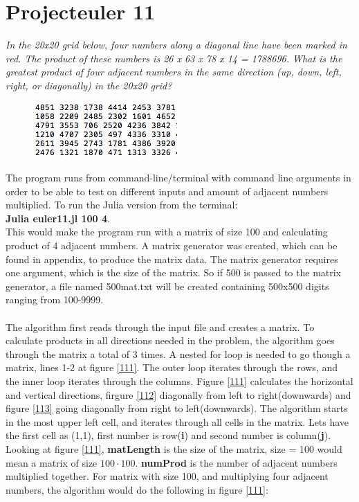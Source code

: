 \documentclass[a4paper,11pt]{article}
\begin{document}
\section{Projecteuler 11}

\textit{In the 20x20 grid below, four numbers along a diagonal line have been marked in red. The product of these numbers is 26 x 63 x 78 x 14 = 1788696. What is the greatest product of four adjacent numbers in the same direction (up, down, left, right, or diagonally) in the 20x20 grid?}
\begin{figure}[H]
	\begin{center}
	\includegraphics[scale=0.80]{11.jpg}
	\label{11}
	\end{center}
\end{figure}
The program runs from command-line/terminal with command line arguments in order to be able to test on different inputs and amount of adjacent numbers multiplied. To run the Julia version from the terminal: \\
\textbf{Julia euler11.jl 100 4}. \\
This would make the program run with a matrix of size 100 and calculating product of 4 adjacent numbers. A matrix generator was created, which can be found in appendix, to produce the matrix data. The matrix generator requires one argument, which is the size of the matrix. So if 500 is passed to the matrix generator, a file named 500mat.txt will be created containing 500x500 digits ranging from 100-9999.\\
\\
The algorithm first reads through the input file and creates a matrix. To calculate products in all directions needed in the problem, the algorithm goes through the matrix a total of 3 times. A nested for loop is needed to go though a matrix, lines 1-2 at figure \ref{111}. The outer loop iterates through the rows, and the inner loop iterates through the columns. Figure \ref{111} calculates the horizontal and vertical directions, firgure \ref{112} diagonally from left to right(downwards) and figure \ref{113} going diagonally from right to left(downwards). The algorithm starts in the most upper left cell, and iterates through all cells in the matrix. Lets have the first cell as (1,1), first number is row(\textbf{i}) and second number is column(\textbf{j}). Looking at figure \ref{111}, \textbf{matLength} is the size of the matrix, size = 100 would mean a matrix of size $100 \cdot 100$. \textbf{numProd} is the number of adjacent numbers multiplied together. For matrix with size 100, and multiplying four adjacent numbers, the algorithm would do the following in figure \ref{111}: 
\end{document}
